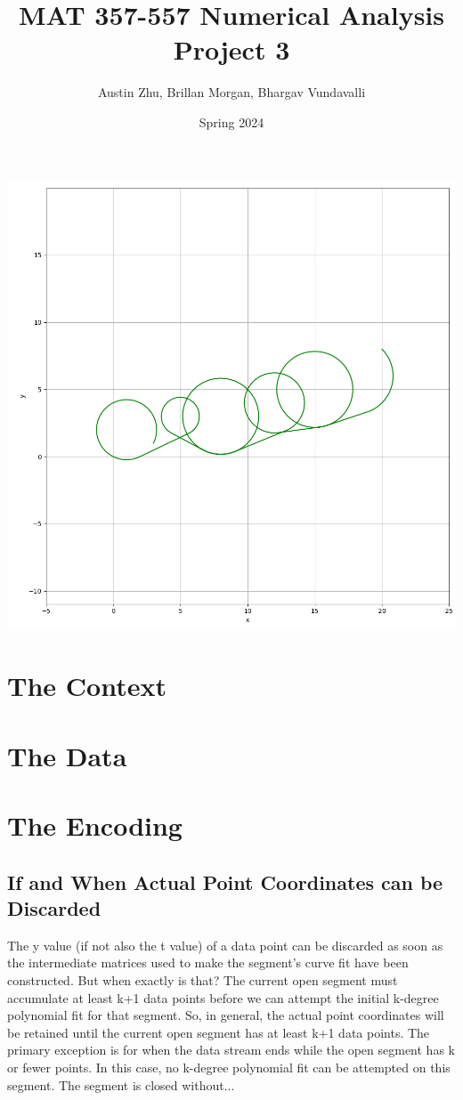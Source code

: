 \documentclass{article}
\title{MAT 357-557 Numerical Analysis Project 3}
\author{Austin Zhu, Brillan Morgan, Bhargav Vundavalli}
\date{Spring 2024}
\begin{document}
\maketitle

\begin{center}
\includegraphics[width=1.0\linewidth]{Plots/CoverPlot.png}
\newpage
\end{center}



\section{The Context}

\section{The Data}

\section{The Encoding}

\subsection{If and When Actual Point Coordinates can be Discarded}
\label{subsec:when_can_discard_point_coords}
The y value (if not also the t value) of a data point can be discarded as soon as the intermediate matrices used to make the segment’s curve fit have been constructed. But when exactly is that? The current open segment must accumulate at least k+1 data points before we can attempt the initial k-degree polynomial fit for that segment. So, in general, the actual point coordinates will be retained until the current open segment has at least k+1 data points. The primary exception is for when the data stream ends while the open segment has k or fewer points. In this case, no k-degree polynomial fit can be attempted on this segment. The segment is closed without...
\end{document}
